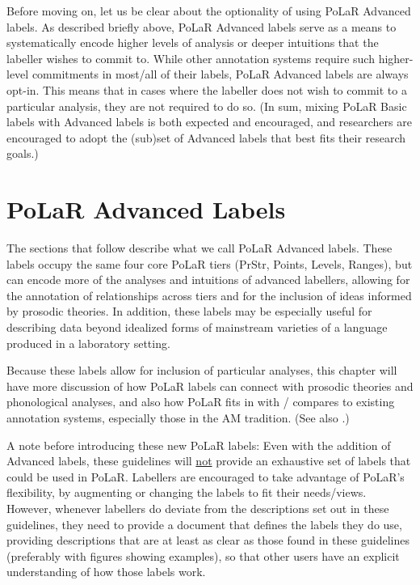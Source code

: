 \documentclass[11pt, twoside]{memoir}
\begin{document}
Before moving on, let us be clear about the optionality of using PoLaR Advanced labels. As described briefly above, PoLaR Advanced labels serve as a means to systematically encode higher levels of analysis or deeper intuitions that the labeller wishes to commit to. While other annotation systems require such higher-level commitments in most\slash all of their labels, PoLaR Advanced labels are always opt-in. This means that in cases where the labeller does not wish to commit to a particular analysis, they are not required to do so. (In sum, mixing PoLaR Basic labels with Advanced labels is both expected and encouraged, and researchers are encouraged to adopt the (sub)set of Advanced labels that best fits their research goals.)

\section{PoLaR Advanced Labels}\label{sec:polar-advanced-labels}

The sections that follow describe what we call PoLaR Advanced labels. These labels occupy the same four core PoLaR tiers (PrStr, Points, Levels, Ranges), but can encode more of the analyses and intuitions of advanced labellers, allowing for the annotation of relationships across tiers and for the inclusion of ideas informed by prosodic theories. In addition, these labels may be especially useful for describing data beyond idealized forms of mainstream varieties of a language produced in a laboratory setting.

Because these labels allow for inclusion of particular analyses, this chapter will have more discussion of how PoLaR labels can connect with prosodic theories and phonological analyses, and also how PoLaR fits in with / compares to existing annotation systems, especially those in the AM tradition. (See also \citealt{ahn-19}.)

A note before introducing these new PoLaR labels: Even with the addition of Advanced labels, these guidelines will \uline{not} provide an exhaustive set of labels that could be used in PoLaR. Labellers are encouraged to take advantage of PoLaR’s flexibility, by augmenting or changing the labels to fit their needs\slash views. However, whenever labellers do deviate from the descriptions set out in these guidelines, they need to provide a document that defines the labels they do use, providing descriptions that are at least as clear as those found in these guidelines (preferably with figures showing examples), so that other users have an explicit understanding of how those labels work.
\end{document}
